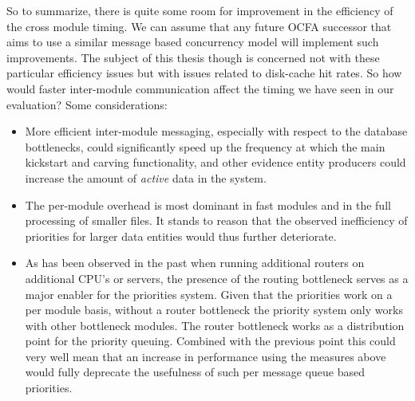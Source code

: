 So to summarize, there is quite some room for improvement in the efficiency of the cross module timing. We can assume that any future OCFA successor that aims to use a similar message based concurrency model will implement such improvements. The subject of this thesis though is concerned not with these particular efficiency issues but with issues related to disk-cache hit rates. So how would faster inter-module communication affect the timing we have seen in our evaluation? Some considerations:
\begin{itemize}
\item More efficient inter-module messaging, especially with respect to the database bottlenecks, could significantly speed up the frequency at which the main kickstart and carving functionality, and other evidence entity producers could increase the amount of \emph{active} data in the system. 
\item The per-module overhead is most dominant in fast modules and in the full processing of smaller files. It stands to reason that the observed inefficiency of priorities for larger data entities would thus further deteriorate.
\item As has been observed in the past when running additional routers on additional CPU's or servers, the presence of the routing bottleneck serves as a major enabler for the priorities system. Given that the priorities work on a per module basis, without a router bottleneck the priority system only works with other bottleneck modules. The router bottleneck works as a distribution point for the priority queuing. Combined with the previous point this could very well mean that an increase in performance using the measures above would fully deprecate the usefulness of such per message queue based priorities. 
\end{itemize}
